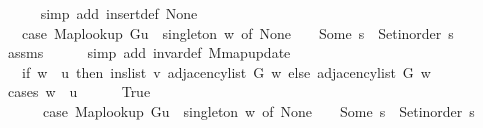 \begin{isabellebody}
\ \ \ \ \isamarkupfalse%
\ {\isacharparenleft}{\kern0pt}simp\ add{\isacharcolon}{\kern0pt}\ insert{\isacharunderscore}{\kern0pt}def\ None{\isacharparenright}{\kern0pt}\isanewline
\ \ \isamarkupfalse%
\ \isamarkupfalse%
\ {\isachardoublequoteopen}{\isachardot}{\kern0pt}{\isachardot}{\kern0pt}{\isachardot}{\kern0pt}\ {\isacharequal}{\kern0pt}\ {\isacharparenleft}{\kern0pt}case\ {\isacharparenleft}{\kern0pt}Map{\isacharunderscore}{\kern0pt}lookup\ G{\isacharparenleft}{\kern0pt}{\isacharquery}{\kern0pt}u\ {\isasymmapsto}\ {\isacharquery}{\kern0pt}singleton{\isacharparenright}{\kern0pt}{\isacharparenright}{\kern0pt}\ w\ of\ None\ {\isasymRightarrow}\ {\isacharbrackleft}{\kern0pt}{\isacharbrackright}{\kern0pt}\ {\isacharbar}{\kern0pt}\ Some\ s\ {\isasymRightarrow}\ Set{\isacharunderscore}{\kern0pt}inorder\ s{\isacharparenright}{\kern0pt}{\isachardoublequoteclose}\isanewline
\ \ \ \ \isamarkupfalse%
\ assms\isanewline
\ \ \ \ \isamarkupfalse%
\ {\isacharparenleft}{\kern0pt}simp\ add{\isacharcolon}{\kern0pt}\ invar{\isacharunderscore}{\kern0pt}def\ M{\isachardot}{\kern0pt}map{\isacharunderscore}{\kern0pt}update{\isacharparenright}{\kern0pt}\isanewline
\ \ \isamarkupfalse%
\ \isamarkupfalse%
\ {\isachardoublequoteopen}{\isachardot}{\kern0pt}{\isachardot}{\kern0pt}{\isachardot}{\kern0pt}\ {\isacharequal}{\kern0pt}\ {\isacharparenleft}{\kern0pt}if\ w\ {\isacharequal}{\kern0pt}\ {\isacharquery}{\kern0pt}u\ then\ ins{\isacharunderscore}{\kern0pt}list\ {\isacharquery}{\kern0pt}v\ {\isacharparenleft}{\kern0pt}adjacency{\isacharunderscore}{\kern0pt}list\ G\ w{\isacharparenright}{\kern0pt}\ else\ adjacency{\isacharunderscore}{\kern0pt}list\ G\ w{\isacharparenright}{\kern0pt}{\isachardoublequoteclose}\isanewline
\ \ \isamarkupfalse%
\ {\isacharparenleft}{\kern0pt}cases\ {\isachardoublequoteopen}w\ {\isacharequal}{\kern0pt}\ {\isacharquery}{\kern0pt}u{\isachardoublequoteclose}{\isacharparenright}{\kern0pt}\isanewline
\ \ \ \ \isamarkupfalse%
\ True\isanewline
\ \ \ \ \isamarkupfalse%
\isanewline
\ \ \ \ \ \ {\isachardoublequoteopen}{\isacharparenleft}{\kern0pt}case\ {\isacharparenleft}{\kern0pt}Map{\isacharunderscore}{\kern0pt}lookup\ G{\isacharparenleft}{\kern0pt}{\isacharquery}{\kern0pt}u\ {\isasymmapsto}\ {\isacharquery}{\kern0pt}singleton{\isacharparenright}{\kern0pt}{\isacharparenright}{\kern0pt}\ w\ of\ None\ {\isasymRightarrow}\ {\isacharbrackleft}{\kern0pt}{\isacharbrackright}{\kern0pt}\ {\isacharbar}{\kern0pt}\ Some\ s\ {\isasymRightarrow}\ Set{\isacharunderscore}{\kern0pt}inorder\ s{\isacharparenright}{\kern0pt}\ {\isacharequal}{\kern0pt}\isanewline

\end{isabellebody}
